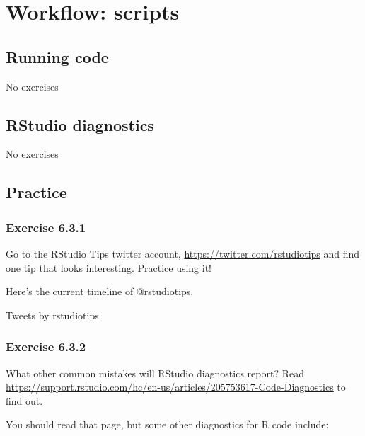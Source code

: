 \documentclass[]{book}
\theoremstyle{plain}
\theoremstyle{remark}
\begin{document}
\hypertarget{workflow-scripts}{%
\chapter{Workflow: scripts}\label{workflow-scripts}}

\hypertarget{running-code}{%
\section{Running code}\label{running-code}}

No exercises

\hypertarget{rstudio-diagnostics}{%
\section{RStudio diagnostics}\label{rstudio-diagnostics}}

No exercises

\hypertarget{practice-1}{%
\section{Practice}\label{practice-1}}

\hypertarget{exercise-6.3.1}{%
\subsection*{\texorpdfstring{Exercise {6.3.1}}{Exercise 6.3.1}}\label{exercise-6.3.1}}

Go to the RStudio Tips twitter account, \url{https://twitter.com/rstudiotips} and find one tip that looks interesting. Practice using it!

Here's the current timeline of @rstudiotips.

Tweets by rstudiotips

\hypertarget{exercise-6.3.2}{%
\subsection*{\texorpdfstring{Exercise {6.3.2}}{Exercise 6.3.2}}\label{exercise-6.3.2}}

What other common mistakes will RStudio diagnostics report?
Read \url{https://support.rstudio.com/hc/en-us/articles/205753617-Code-Diagnostics} to find out.

You should read that page, but some other diagnostics for R code include:
\end{document}
